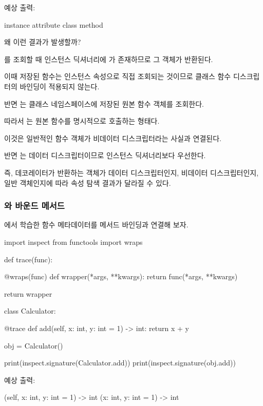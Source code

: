 예상 출력:

\begin{dhkzsh}
instance attribute
class method
\end{dhkzsh}

왜 이런 결과가 발생할까?

를 조회할 때 인스턴스 딕셔너리에 가 존재하므로 그 객체가 반환된다.

이때 저장된  함수는 인스턴스 속성으로 직접 조회되는 것이므로 클래스 함수 디스크립터의 바인딩이 적용되지 않는다.

반면 는 클래스 네임스페이스에 저장된 원본 함수 객체를 조회한다.

따라서 는 원본 함수를 명시적으로 호출하는 형태다.

이것은 일반적인 함수 객체가 비데이터 디스크립터라는 사실과 연결된다.

반면 는 데이터 디스크립터이므로 인스턴스 딕셔너리보다 우선한다.

즉, 데코레이터가 반환하는 객체가 데이터 디스크립터인지, 비데이터 디스크립터인지, 일반 객체인지에 따라 속성 탐색 결과가 달라질 수 있다.

\subsubsection{와 바운드 메서드}

에서 학습한 함수 메타데이터를 메서드 바인딩과 연결해 보자.

\begin{dhkcode}
import inspect
from functools import wraps

def trace(func):

    @wraps(func)
    def wrapper(*args, **kwargs):
        return func(*args, **kwargs)

    return wrapper


class Calculator:

    @trace
    def add(self, x: int, y: int = 1) -> int:
        return x + y


obj = Calculator()

print(inspect.signature(Calculator.add))
print(inspect.signature(obj.add))
\end{dhkcode}

예상 출력:

\begin{dhkzsh}
(self, x: int, y: int = 1) -> int
(x: int, y: int = 1) -> int
\end{dhkzsh}

